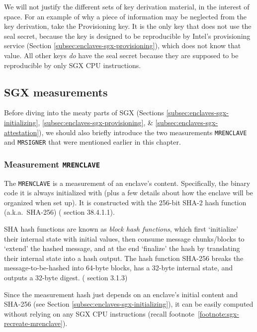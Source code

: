 We will not justify the different sets of key derivation material, in the interest of space. For an example of why a piece of information may be neglected from the key derivation, take the Provisioning key. It is the only key that does not use the seal secret, because the key is designed to be reproducible by Intel's provisioning service (Section \ref{subsec:enclaves-sgx-provisioning}), which does not know that value. All other keys {\em do} have the seal secret because they are supposed to be reproducible by only SGX CPU instructions.


\subsection{SGX measurements}
\label{subsec:enclaves-sgx-measurements}

Before diving into the meaty parts of SGX (Sections \ref{subsec:enclaves-sgx-initializing}, \ref{subsec:enclaves-sgx-provisioning}, \& \ref{subsec:enclaves-sgx-attestation}), we should also briefly introduce the two measurements {\tt MRENCLAVE} and {\tt MRSIGNER} that were mentioned earlier in this chapter.

\subsubsection{Measurement {\tt MRENCLAVE}}

The {\tt MRENCLAVE} is a measurement of an enclave's content. Specifically, the binary code it is always initialized with (plus a few details about how the enclave will be organized when set up). It is constructed with the 256-bit SHA-2 hash function (a.k.a.\ SHA-256) (\cite{sgx-manual} section 38.4.1.1).

SHA hash functions are known as {\em block hash functions}, which first `initialize' their internal state with initial values, then consume message chunks/blocks to `extend' the hashed message, and at the end `finalize' the hash by translating their internal state into a hash output. The hash function SHA-256 breaks the message-to-be-hashed into 64-byte blocks, has a 32-byte internal state, and outputs a 32-byte digest. (\cite{intel-sgx-explained-advanced} section 3.1.3)

Since the measurement hash just depends on an enclave's initial content and SHA-256 (see Section \ref{subsec:enclaves-sgx-initializing}), it can be easily computed without relying on any SGX CPU instructions (recall footnote~\ref{footnote:sgx-recreate-mrenclave}).

